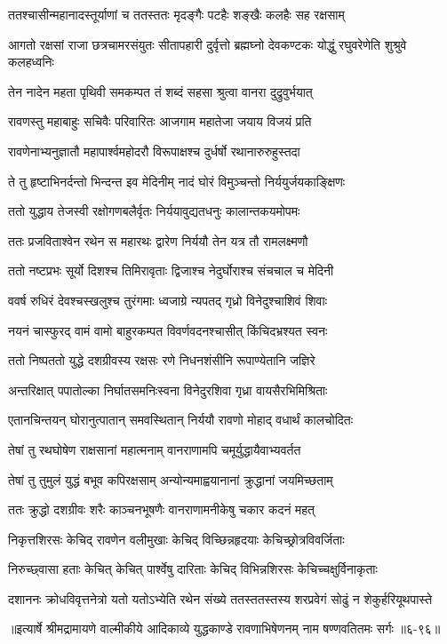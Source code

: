 \twolineshloka
{ततश्चासीन्महानादस्तूर्याणां च ततस्ततः}
{मृदङ्गैः पटहैः शङ्खैः कलहैः सह रक्षसाम्} %

\threelineshloka
{आगतो रक्षसां राजा छत्रचामरसंयुतः}
{सीतापहारी दुर्वृत्तो ब्रह्मघ्नो देवकण्टकः}
{योद्धुं रघुवरेणेति शुश्रुवे कलहध्वनिः} %

\twolineshloka
{तेन नादेन महता पृथिवी समकम्पत}
{तं शब्दं सहसा श्रुत्वा वानरा दुद्रुवुर्भयात्} %

\twolineshloka
{रावणस्तु महाबाहुः सचिवैः परिवारितः}
{आजगाम महातेजा जयाय विजयं प्रति} %

\twolineshloka
{रावणेनाभ्यनुज्ञातौ महापार्श्वमहोदरौ}
{विरूपाक्षश्च दुर्धर्षो रथानारुरुहुस्तदा} %

\twolineshloka
{ते तु हृष्टाभिनर्दन्तो भिन्दन्त इव मेदिनीम्}
{नादं घोरं विमुञ्चन्तो निर्ययुर्जयकाङ्क्षिणः} %

\twolineshloka
{ततो युद्धाय तेजस्वी रक्षोगणबलैर्वृतः}
{निर्ययावुद्यतधनुः कालान्तकयमोपमः} %

\twolineshloka
{ततः प्रजविताश्वेन रथेन स महारथः}
{द्वारेण निर्ययौ तेन यत्र तौ रामलक्ष्मणौ} %

\twolineshloka
{ततो नष्टप्रभः सूर्यो दिशश्च तिमिरावृताः}
{द्विजाश्च नेदुर्घोराश्च संचचाल च मेदिनी} %

\twolineshloka
{ववर्ष रुधिरं देवश्चस्खलुश्च तुरंगमाः}
{ध्वजाग्रे न्यपतद् गृध्रो विनेदुश्चाशिवं शिवाः} %

\twolineshloka
{नयनं चास्फुरद् वामं वामो बाहुरकम्पत}
{विवर्णवदनश्चासीत् किंचिदभ्रश्यत स्वनः} %

\twolineshloka
{ततो निष्पततो युद्धे दशग्रीवस्य रक्षसः}
{रणे निधनशंसीनि रूपाण्येतानि जज्ञिरे} %

\twolineshloka
{अन्तरिक्षात् पपातोल्का निर्घातसमनिःस्वना}
{विनेदुरशिवा गृध्रा वायसैरभिमिश्रिताः} %

\twolineshloka
{एतानचिन्तयन् घोरानुत्पातान् समवस्थितान्}
{निर्ययौ रावणो मोहाद् वधार्थं कालचोदितः} %

\twolineshloka
{तेषां तु रथघोषेण राक्षसानां महात्मनाम्}
{वानराणामपि चमूर्युद्धायैवाभ्यवर्तत} %

\twolineshloka
{तेषां तु तुमुलं युद्धं बभूव कपिरक्षसाम्}
{अन्योन्यमाह्वयानानां क्रुद्धानां जयमिच्छताम्} %

\twolineshloka
{ततः क्रुद्धो दशग्रीवः शरैः काञ्चनभूषणैः}
{वानराणामनीकेषु चकार कदनं महत्} %

\twolineshloka
{निकृत्तशिरसः केचिद् रावणेन वलीमुखाः}
{केचिद् विच्छिन्नहृदयाः केचिच्छ्रोत्रविवर्जिताः} %

\twolineshloka
{निरुच्छ्वासा हताः केचित् केचित् पार्श्वेषु दारिताः}
{केचिद् विभिन्नशिरसः केचिच्चक्षुर्विनाकृताः} %

\twolineshloka
{दशाननः क्रोधविवृत्तनेत्रो यतो यतोऽभ्येति रथेन संख्ये}
{ततस्ततस्तस्य शरप्रवेगं सोढुं न शेकुर्हरियूथपास्ते} %


॥इत्यार्षे श्रीमद्रामायणे वाल्मीकीये आदिकाव्ये युद्धकाण्डे रावणाभिषेणनम् नाम षण्णवतितमः सर्गः ॥६-९६॥
